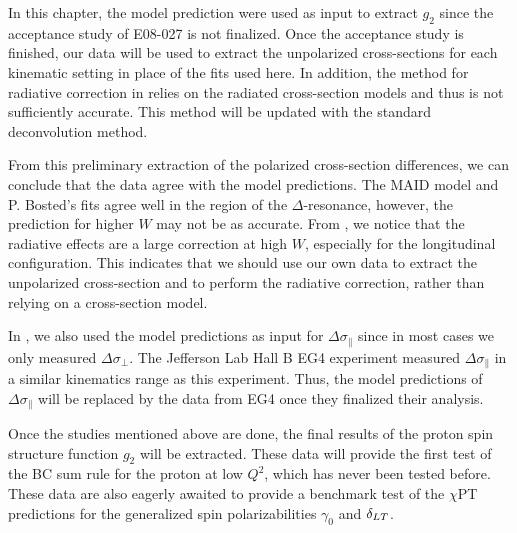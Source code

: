 In this chapter, the model prediction were used as input to extract $g_2$ since the acceptance study of E08-027 is not finalized. Once the acceptance study is finished, our data will be used to extract the unpolarized cross-sections for each kinematic setting in place of the fits used here. In addition, the method for radiative correction in  relies on the radiated cross-section models and thus is not sufficiently accurate. This method will be updated with the standard deconvolution method.

From this preliminary extraction of the polarized cross-section differences, we can conclude that the data agree with the model predictions. The MAID model and P. Bosted's fits agree well in the region of the $\Delta$-resonance, however, the prediction for higher $W$ may not be as accurate. From , we notice that the radiative effects are a large correction at high $W$, especially for the longitudinal configuration. This indicates that we should use our own data to extract the unpolarized cross-section and to perform the radiative correction, rather than relying on a cross-section model.

In , we also used the model predictions as input for $\Delta\sigma_{\parallel}$ since in most cases we only measured $\Delta\sigma_{\perp}$. The Jefferson Lab Hall B EG4 experiment measured $\Delta\sigma_{\parallel}$ in a similar kinematics range as this experiment. Thus, the model predictions of $\Delta\sigma_{\parallel}$ will be replaced by the data from EG4 once they finalized their analysis.

Once the studies mentioned above are done, the final results of the proton spin structure function $g_2$ will be extracted. These data will provide the first test of the BC sum rule for the proton at low $Q^2$, which has never been tested before. These data are also eagerly awaited to provide a benchmark test of the $\chi$PT predictions for the generalized spin polarizabilities $\gamma_0$ and $\delta_{LT}$.

